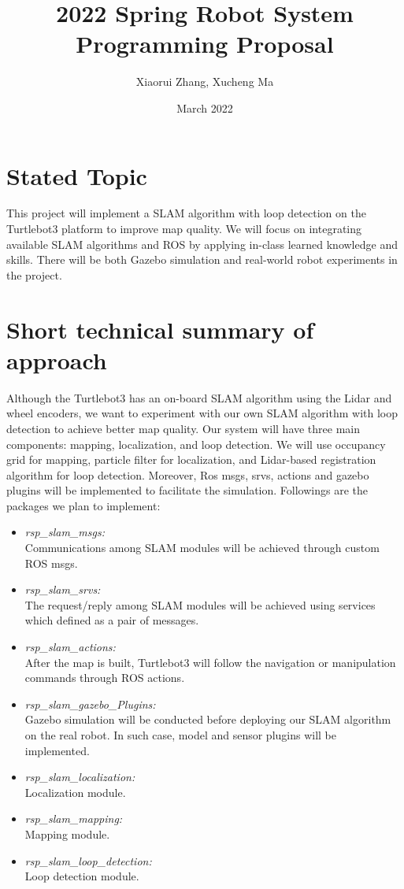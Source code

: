 \documentclass[11pt]{article} \usepackage[top=1in, bottom=1in, left=1in, right=1in]{geometry}
\title{2022 Spring Robot System Programming Proposal }
\author{Xiaorui Zhang, Xucheng Ma}
\date{March 2022}
\begin{document}
\maketitle

\section{Stated Topic}
This project will implement a SLAM algorithm with loop detection on the Turtlebot3 platform to improve map quality. We will focus on integrating available SLAM algorithms and ROS by applying in-class learned knowledge and skills. There will be both Gazebo simulation and real-world robot experiments in the project.

\section{Short technical summary of approach}
Although the Turtlebot3 has an on-board SLAM algorithm using the Lidar and wheel encoders, we want to experiment with our own SLAM algorithm with loop detection to achieve better map quality. Our system will have three main components: mapping, localization, and loop detection. We will use occupancy grid for mapping, particle filter for localization, and Lidar-based registration algorithm for loop detection. Moreover, Ros msgs, srvs, actions and gazebo plugins will be implemented to facilitate the simulation. Followings are the packages we plan to implement:
\begin{itemize}
    \item \textit{rsp\_slam\_msgs:}\\
    Communications among SLAM modules will be achieved through custom ROS msgs. 
    \item \textit{rsp\_slam\_srvs:}\\
   The request/reply among SLAM modules will be achieved using services which defined as a pair of messages.
   \item \textit{rsp\_slam\_actions:}\\
   After the map is built, Turtlebot3 will follow the navigation or manipulation commands through ROS actions.
   \item \textit{rsp\_slam\_gazebo\_Plugins:}\\
   Gazebo simulation will be conducted before deploying our SLAM algorithm on the real robot. In such case, model and sensor plugins will be implemented. 
   \item \textit{rsp\_slam\_localization:} \\
   Localization module.
   \item \textit{rsp\_slam\_mapping:}\\
   Mapping module.
   \item \textit{rsp\_slam\_loop\_detection:}\\
   Loop detection module.
\end{itemize}
\end{document}

